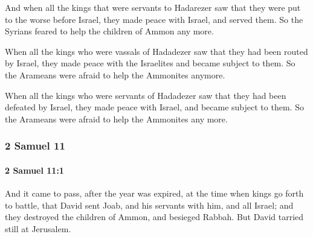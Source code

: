 			\begin{versebox}
					\item[BHS] 
					\item[ASV] And when all the kings that were servants to Hadarezer saw that they were put to the worse before Israel, they made peace with Israel, and served them. So the Syrians feared to help the children of Ammon any more.
					\item[NIV] When all the kings who were vassals of Hadadezer saw that they had been routed by Israel, they made peace with the Israelites and became subject to them. So the Arameans were afraid to help the Ammonites anymore.
					\item[NRSV] When all the kings who were servants of Hadadezer saw that they had been defeated by Israel, they made peace with Israel, and became subject to them. So the Arameans were afraid to help the Ammonites any more.
			\end{versebox}
	\subsubsection{2 Samuel 11} %
		\label{2SAMUEL-11}

		\paragraph{2 Samuel 11:1} %
			\label{2SAMUEL-11-1}

			And it came to pass, after the year was expired, at the time when kings go forth to battle, that David sent Joab, and his servants with him, and all Israel; and they destroyed the children of Ammon, and besieged Rabbah. But David tarried still at Jerusalem.

